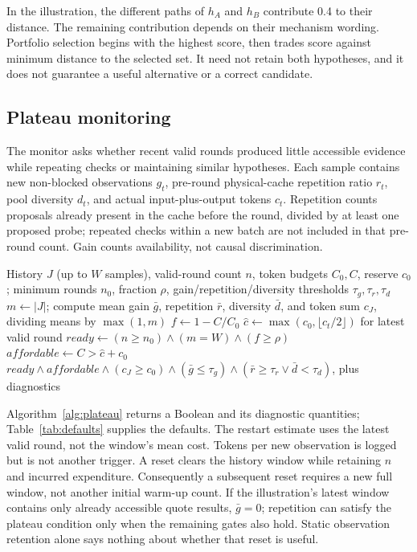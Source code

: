 \documentclass[letterpaper,journal]{IEEEtran}
\begin{document}
In the illustration, the different paths of $h_A$ and $h_B$ contribute 0.4 to their distance. The remaining contribution depends on their mechanism wording. Portfolio selection begins with the highest score, then trades score against minimum distance to the selected set. It need not retain both hypotheses, and it does not guarantee a useful alternative or a correct candidate.

\subsection{Plateau monitoring}\label{sec:plateau}
The monitor asks whether recent valid rounds produced little accessible evidence while repeating checks or maintaining similar hypotheses. Each sample contains new non-blocked observations $g_t$, pre-round physical-cache repetition ratio $r_t$, pool diversity $d_t$, and actual input-plus-output tokens $c_t$. Repetition counts proposals already present in the cache before the round, divided by at least one proposed probe; repeated checks within a new batch are not included in that pre-round count. Gain counts availability, not causal discrimination.

\begin{algorithm}[t]
\caption{Plateau decision}\label{alg:plateau}
\begin{algorithmic}[1]\small
\Require History $J$ (up to $W$ samples), valid-round count $n$, token budgets $C_0,C$, reserve $c_0$; minimum rounds $n_0$, fraction $\rho$, gain/repetition/diversity thresholds $\tau_g,\tau_r,\tau_d$
\State $m\gets |J|$; compute mean gain $\bar g$, repetition $\bar r$, diversity $\bar d$, and token sum $c_J$, dividing means by $\max(1,m)$
\State $f\gets1-C/C_0$
\State $\widehat c\gets\max(c_0,\lfloor c_t/2\rfloor)$ for latest valid round
\State $ready\gets(n\ge n_0)\land(m=W)\land(f\ge\rho)$
\State $affordable\gets C>\widehat c+c_0$
\State \Return $ready\land affordable\land(c_J\ge c_0)\land(\bar g\le\tau_g)\land(\bar r\ge\tau_r\lor\bar d<\tau_d)$, plus diagnostics
\end{algorithmic}
\end{algorithm}

Algorithm~\ref{alg:plateau} returns a Boolean and its diagnostic quantities; Table~\ref{tab:defaults} supplies the defaults. The restart estimate uses the latest valid round, not the window's mean cost. Tokens per new observation is logged but is not another trigger. A reset clears the history window while retaining $n$ and incurred expenditure. Consequently a subsequent reset requires a new full window, not another initial warm-up count. If the illustration's latest window contains only already accessible quote results, $\bar g=0$; repetition can satisfy the plateau condition only when the remaining gates also hold. Static observation retention alone says nothing about whether that reset is useful.
\end{document}
